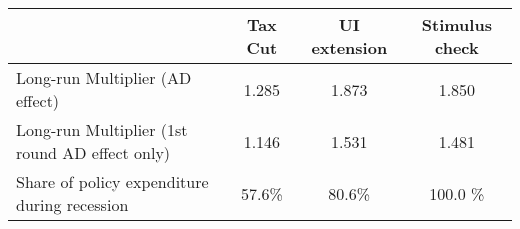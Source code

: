 \begin{tabular}{@{}lccc@{}} 
\toprule 
& Tax Cut    & UI extension    & Stimulus check    \\  \midrule 
Long-run Multiplier (AD effect) &1.285  & 1.873  & 1.850     \\ 
Long-run Multiplier (1st round AD effect only) &1.146  & 1.531  & 1.481     \\ 
Share of policy expenditure during recession &57.6\%  & 80.6\%  & 100.0 \%    \\ 
\end{tabular}  
